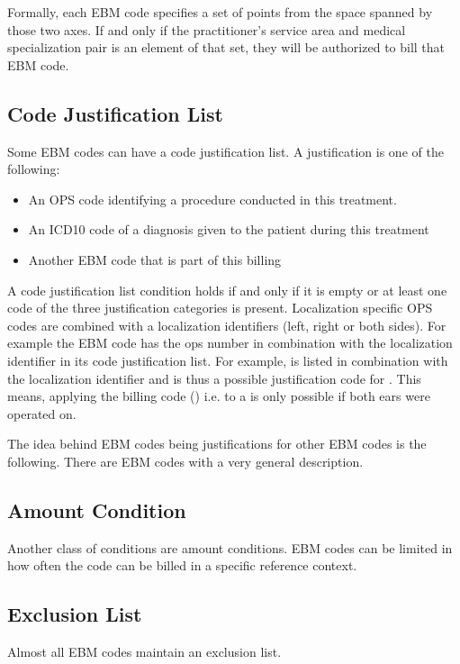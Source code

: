 Formally, each EBM code specifies a set of points from the space spanned by those two axes.
If and only if the practitioner's service area and medical specialization pair is an element of that set, they will be authorized to bill that EBM code.


\subsection{Code Justification List}
Some EBM codes can have a code justification list.
A justification is one of the following:
\begin{itemize}
    \item An OPS code identifying a procedure conducted in this treatment.
    \item An ICD10 code of a diagnosis given to the patient during this treatment
    \item Another EBM code that is part of this billing
\end{itemize}
A code justification list condition holds if and only if it is empty or at least one code of the three justification categories is present.
Localization specific OPS codes are combined with a localization identifiers (left, right or both sides).
For example the EBM code  has the ops number  in combination with the  localization identifier in its code justification list.
For example,  is listed in combination with the  localization identifier and is thus a possible justification code for .
This means, applying the billing code  () i.e.  to a  is only possible if both ears were operated on.

The idea behind EBM codes being justifications for other EBM codes is the following.
There are EBM codes with a very general description.

\subsection{Amount Condition}

Another class of conditions are amount conditions.
EBM codes can be limited in how often the code can be billed in a specific reference context.


\subsection{Exclusion List}\label{subsec:exclusion-list}
Almost all EBM codes maintain an exclusion list.

